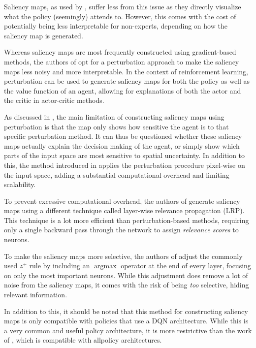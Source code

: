 \documentclass[sigconf]{acmart}
\DeclareMathOperator*{\argmax}{argmax}
\begin{document}
Saliency maps, as used by \cite{Greydanus2018,Huber2019,Nikulin2019}, suffer less from this issue as they directly visualize what the policy (seemingly) attends to.
However, this comes with the cost of potentially being less interpretable for non-experts, depending on how the saliency map is generated.

Whereas saliency maps are most frequently constructed using gradient-based methods, the authors of \cite{Greydanus2018} opt for a perturbation approach to make the saliency maps less noisy and more interpretable.
In the context of reinforcement learning, perturbation can be used to generate saliency maps for both the policy as well as the value function of an agent, allowing for explanations of both the actor and the critic in actor-critic methods.

As discussed in \cite{huber2022benchmarking}, the main limitation of constructing saliency maps using perturbation is that the map only shows how sensitive the agent is to that specific perturbation method.
It can thus be questioned whether these saliency maps actually explain the decision making of the agent, or simply show which parts of the input space are most sensitive to spatial uncertainty.
In addition to this, the method introduced in \cite{Greydanus2018} applies the perturbation procedure pixel-wise on the input space, adding a substantial computational overhead and limiting scalability.

To prevent excessive computational overhead, the authors of \cite{Huber2019} generate saliency maps using a different technique called layer-wise relevance propagation (LRP).
This technique is a lot more efficient than perturbation-based methods, requiring only a single backward pass through the network to assign \textit{relevance scores} to neurons.

To make the saliency maps more selective, the authors of \cite{Huber2019} adjust the commonly used $z^+$ rule by including an $\argmax$ operator at the end of every layer, focusing on only the most important neurons.
While this adjustment does remove a lot of noise from the saliency maps, it comes with the risk of being \textit{too} selective, hiding relevant information.

In addition to this, it should be noted that this method for constructing saliency maps is only compatible with policies that use a DQN architecture.
While this is a very common and useful policy architecture, it is more restrictive than the work of \cite{Zahavy2016,Greydanus2018}, which is compatible with all\footnotemark[1] policy architectures.
\end{document}
